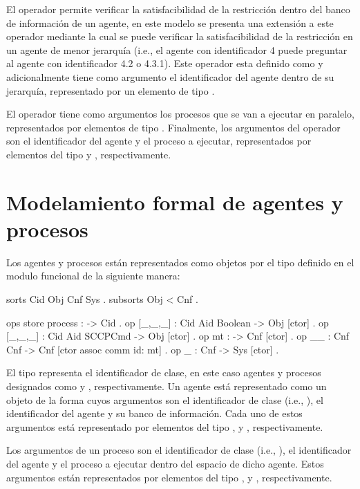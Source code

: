 El operador  permite verificar la satisfacibilidad de la restricci\'on dentro del banco de informaci\'on de un agente, en este modelo se presenta una extensi\'on a este operador mediante la cual se puede verificar la satisfacibilidad de la restricci\'on en un agente de menor jerarqu\'ia (i.e., el agente con identificador 4 puede preguntar al agente con identificador 4.2 o 4.3.1). Este operador esta definido como  y adicionalmente tiene como argumento el identificador del agente dentro de su jerarqu\'ia, representado por un elemento de tipo .

El operador \cde{_||_} tiene como argumentos los procesos que se van a ejecutar en paralelo, representados por elementos de tipo . Finalmente, los argumentos del operador \cde{<_>[_]} son el identificador del agente y el proceso a ejecutar, representados por elementos del tipo  y , respectivamente. 

\section{Modelamiento formal de agentes y procesos}
\label{state.rew}

Los agentes y procesos est\'an representados como objetos por el tipo  definido en el modulo funcional  de la siguiente manera:

\begin{maude}
  sorts Cid Obj Cnf Sys .
  subsorts Obj < Cnf .
  
  ops store process : -> Cid .
  op [_,_,_] : Cid Aid Boolean -> Obj [ctor] .
  op [_,_,_] : Cid Aid SCCPCmd -> Obj [ctor] .
  op mt : -> Cnf [ctor] .
  op __ : Cnf Cnf -> Cnf [ctor assoc comm id: mt] .
  op {_} : Cnf -> Sys [ctor] .
\end{maude}

El tipo  representa el identificador de clase, en este caso agentes y procesos designados como  y , respectivamente. Un agente est\'a representado como un objeto de la forma \cde{[_,_,_]} cuyos argumentos son el identificador de clase (i.e., ), el identificador del agente y su banco de informaci\'on. Cada uno de estos argumentos est\'a representado por elementos del tipo ,  y , respectivamente.

Los argumentos de un proceso son el identificador de clase (i.e., ), el identificador del agente y el proceso a ejecutar dentro del espacio de dicho agente. Estos argumentos est\'an representados por elementos del tipo ,  y , respectivamente.

